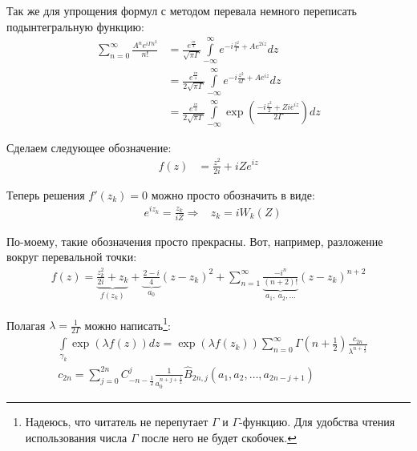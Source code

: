 \documentclass[a4paper, 12pt]{article}
\begin{document}
Так же для упрощения формул с методом перевала немного переписать подынтегральную функцию:
\begin{equation}
\begin{aligned}
    \sum\limits_{n=0}^{\infty} \frac{A^n e^{i\Gamma n^2}}{n!} 
    &= \frac{e^{\frac{i\pi}{4}}}{\sqrt{\pi\Gamma}}
    \int\limits_{-\infty}^{\infty}e^{-i \frac{z^2}{\Gamma} + A e^{2iz}}dz \\
    &= \frac{e^{\frac{i\pi}{4}}}{2\sqrt{\pi\Gamma}}
    \int\limits_{-\infty}^{\infty}e^{-i \frac{z^2}{4\Gamma} + A e^{iz}}dz \\
    &= \frac{e^{\frac{i\pi}{4}}}{2\sqrt{\pi\Gamma}}
    \int\limits_{-\infty}^{\infty}\exp\left(\frac{-i\frac{z^2}{2} + Z i e^{iz}}{2\Gamma}\right)dz 
\end{aligned}
\end{equation}

Сделаем следующее обозначение:
\begin{equation}
\begin{aligned}
    f(z) &=  \frac{z^2}{2i} + i Z e^{iz}
\end{aligned}
\end{equation}

Теперь решения $f'(z_k) = 0$ можно просто обозначить в виде:
\begin{equation}
\begin{aligned}
    &e^{i z_k} = \frac{z_k}{iZ} \Rightarrow
    &z_k = i W_k(Z)
\end{aligned}
\end{equation}

По-моему, такие обозначения просто прекрасны. Вот, например, разложение вокруг перевальной точки:
\begin{equation}
\begin{aligned}
    f(z) = \underbrace{\frac{z_k^2}{2i} + z_k}_{f(z_k)} + \underbrace{\frac{2-i}{4}}_{a_0} (z-z_k)^2 + 
    \sum_{n=1}^{\infty} \underbrace{\frac{-i^n}{(n+2)!}}_{a_1, \: a_2, \dots} (z-z_k)^{n+2}
\end{aligned}
\end{equation}

Полагая $\lambda = \frac{1}{2\Gamma}$ можно написать\footnote{Надеюсь, что читатель не перепутает $\Gamma$ и $\Gamma$-функцию. Для удобства чтения использования числа $\Gamma$ после него не будет скобочек.}:
\begin{equation}
\begin{aligned}
    &\int\limits_{\gamma_k} \exp\left(\lambda f(z)\right) dz 
    = \exp\left(\lambda f(z_k)\right)\sum\limits_{n=0}^{\infty} \Gamma\left(n+\frac{1}{2}\right)\frac{c_{2n}}{\lambda^{n+\frac{1}{2}}}\\
    &c_{2n} =
    \sum\limits_{j=0}^{2n} C_{-n-\frac{1}{2}}^j\frac{1}{a_0^{n+j+\frac{1}{2}}}\hat{B}_{2n, j}\left(a_1, a_2, \dots, a_{2n-j+1}\right)
\end{aligned}
\end{equation}
\end{document}
